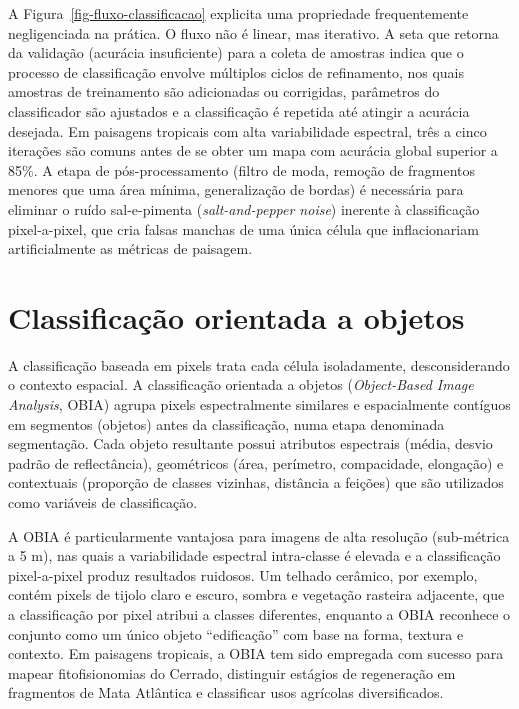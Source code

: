 \documentclass[
  portuguese,
  11pt,
  a4paper,
  open=any]{scrbook}
\begin{document}
A Figura~\ref{fig-fluxo-classificacao} explicita uma propriedade
frequentemente negligenciada na prática. O fluxo não é linear, mas
iterativo. A seta que retorna da validação (acurácia insuficiente) para
a coleta de amostras indica que o processo de classificação envolve
múltiplos ciclos de refinamento, nos quais amostras de treinamento são
adicionadas ou corrigidas, parâmetros do classificador são ajustados e a
classificação é repetida até atingir a acurácia desejada. Em paisagens
tropicais com alta variabilidade espectral, três a cinco iterações são
comuns antes de se obter um mapa com acurácia global superior a 85\%. A
etapa de pós-processamento (filtro de moda, remoção de fragmentos
menores que uma área mínima, generalização de bordas) é necessária para
eliminar o ruído sal-e-pimenta (\emph{salt-and-pepper noise}) inerente à
classificação pixel-a-pixel, que cria falsas manchas de uma única célula
que inflacionariam artificialmente as métricas de paisagem.

\section{Classificação orientada a
objetos}\label{classificauxe7uxe3o-orientada-a-objetos}

A classificação baseada em pixels trata cada célula isoladamente,
desconsiderando o contexto espacial. A classificação orientada a objetos
(\emph{Object-Based Image Analysis}, OBIA) agrupa pixels espectralmente
similares e espacialmente contíguos em segmentos (objetos) antes da
classificação, numa etapa denominada segmentação. Cada objeto resultante
possui atributos espectrais (média, desvio padrão de reflectância),
geométricos (área, perímetro, compacidade, elongação) e contextuais
(proporção de classes vizinhas, distância a feições) que são utilizados
como variáveis de classificação.

A OBIA é particularmente vantajosa para imagens de alta resolução
(sub-métrica a 5 m), nas quais a variabilidade espectral intra-classe é
elevada e a classificação pixel-a-pixel produz resultados ruidosos. Um
telhado cerâmico, por exemplo, contém pixels de tijolo claro e escuro,
sombra e vegetação rasteira adjacente, que a classificação por pixel
atribui a classes diferentes, enquanto a OBIA reconhece o conjunto como
um único objeto ``edificação'' com base na forma, textura e contexto. Em
paisagens tropicais, a OBIA tem sido empregada com sucesso para mapear
fitofisionomias do Cerrado, distinguir estágios de regeneração em
fragmentos de Mata Atlântica e classificar usos agrícolas
diversificados.
\end{document}
